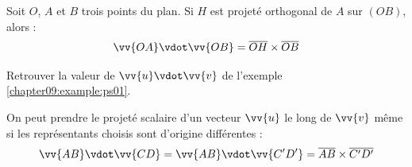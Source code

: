 \documentclass[main.tex]{subfiles}
\begin{document}
\begin{definition}
Soit $O$, $A$ et $B$ trois points du plan. Si $H$ est projeté orthogonal de $A$ sur $(OB)$, alors :
\setlength{\abovedisplayskip}{3pt}
\setlength{\belowdisplayskip}{3pt}
$$
\vv{OA}\vdot \vv{OB}=\overline{OH} \times \overline{OB}  
$$
\end{definition}
\begin{example} Retrouver la valeur de $\vv{u}\vdot\vv{v}$ de l'exemple \ref{chapter09:example:ps01}.
\end{example}
\begin{example} On peut prendre le projeté scalaire d'un vecteur $\vv{u}$ le long de $\vv{v}$ même si les représentants choisis sont d'origine différentes :
	\setlength{\abovedisplayskip}{3pt}
	\setlength{\belowdisplayskip}{3pt}
$$
	\vv{AB}\vdot\vv{CD} =\vv{AB}\vdot \vv{C'D'}=\overline{AB}\times \overline{C'D'}
$$
\end{example}
\end{document}
